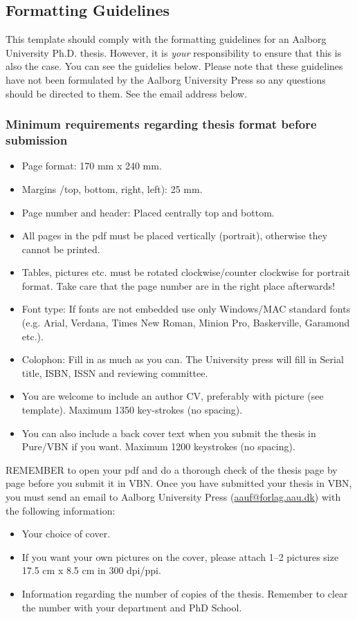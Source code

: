 \subsection{Formatting Guidelines}
This template should comply with the formatting guidelines for an Aalborg University Ph.D. thesis. However, it is \textit{your} responsibility to ensure that this is also the case. You can see the guidelies below. Please note that these guidelines have not been formulated by the Aalborg University Press so any questions should be directed to them. See the email address below.

\subsubsection{Minimum requirements regarding thesis format before submission}
\begin{itemize}
    \item Page format: 170 mm x 240 mm.
    \item Margins /top, bottom, right, left): 25 mm.
    \item Page number and header: Placed centrally top and bottom.
    \item All pages in the pdf must be placed vertically (portrait), otherwise they cannot be printed.
    \item Tables, pictures etc. must be rotated clockwise/counter clockwise for portrait format. Take care that the page number are in the right place afterwards!
    \item Font type: If fonts are not embedded use only Windows/MAC standard fonts (e.g. Arial, Verdana, Times New Roman, Minion Pro, Baskerville, Garamond etc.).
    \item Colophon: Fill in as much as you can. The University press will fill in Serial title, ISBN, ISSN and reviewing committee.
    \item You are welcome to include an author CV, preferably with picture (see template). Maximum 1350 key-strokes (no spacing).
    \item You can also include a back cover text when you submit the thesis in Pure/VBN if you want. Maximum 1200 keystrokes (no spacing).
\end{itemize}
REMEMBER to open your pdf and do a thorough check of the thesis page by page before you submit it in VBN. Once you have submitted your thesis in VBN, you must send an email to Aalborg University Press (\href{mailto:aauf@forlag.aau.dk}{aauf@forlag.aau.dk}) with the following information:
\begin{itemize}
    \item Your choice of cover.
    \item If you want your own pictures on the cover, please attach 1–2 pictures size 17.5 cm x 8.5 cm in 300 dpi/ppi.
    \item Information regarding the number of copies of the thesis. Remember to clear the number with your department and PhD School.
\end{itemize}

